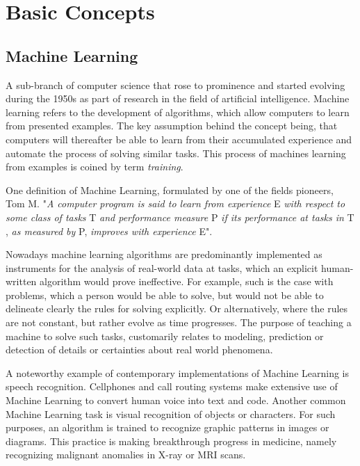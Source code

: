 \section{Basic Concepts}
	\subsection{Machine Learning}
		A sub-branch of computer science that rose to prominence and started evolving during the 1950s as part of research in the field of artificial intelligence. Machine learning refers to the development of algorithms, which allow computers to learn from presented examples. The key assumption behind the concept being, that computers will thereafter be able to learn from their accumulated experience and automate the process of solving similar tasks. This process of machines learning from examples is coined by term \textit{training}.
		
		\par
		
		One definition of Machine Learning, formulated by one of the fields pioneers, Tom M. \cite{mitchell} "\textit{A computer program is said to learn from experience} E \textit{with respect to some class of tasks} T  \textit{and performance measure} P \textit{if its performance at tasks in} T , \textit{as measured by} P, \textit{improves with experience} E".
		
		\par
		
		Nowadays machine learning algorithms are predominantly implemented as instruments for the analysis of real-world data at tasks, which an explicit human-written algorithm would prove ineffective. For example, such is the case with problems, which a person would be able to solve, but would not be able to delineate clearly the rules for solving explicitly. Or alternatively, where the rules are not constant, but rather evolve as time progresses. The purpose of teaching a machine to solve such tasks, customarily relates to modeling, prediction or detection of details or certainties about real world phenomena. 
		
		\par
		
		A noteworthy example of contemporary implementations of Machine Learning is speech recognition. Cellphones and call routing systems make extensive use of Machine Learning to convert human voice into text and code. Another common Machine Learning task is visual recognition of objects or characters. For such purposes, an algorithm is trained to recognize graphic patterns in images or diagrams. This practice is making breakthrough progress in medicine, namely recognizing malignant anomalies in X-ray or MRI scans. 
		
